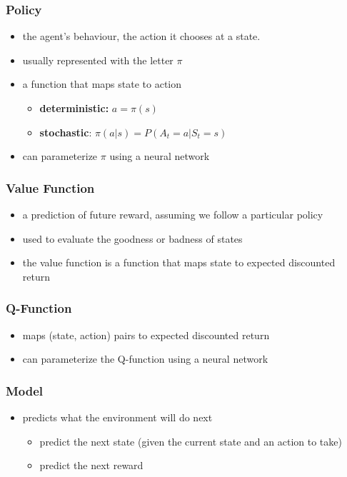 \documentclass[11pt]{article}
\begin{document}
\subsubsection{Policy}
\begin{itemize}
\item the agent's behaviour, the action it chooses at a state.  
\item usually represented with the letter $\pi$
\item a function that maps state to action
\begin{itemize}
\item \textbf{deterministic:} $ a = \pi(s)$
\item \textbf{stochastic}: $\pi (a | s) = P(A_t = a | S_t = s )$
\end{itemize}
\item can parameterize $\pi$ using a neural network
\end{itemize}
\subsubsection{Value Function}
\begin{itemize}
\item a prediction of future reward,  assuming we follow a particular policy
\item used to evaluate the goodness or badness of states
\item the value function is a function that maps state to expected discounted return
\end{itemize}
\subsubsection{Q-Function}
\begin{itemize}
\item maps (state, action) pairs to expected discounted return
\item can parameterize the Q-function using a neural network
\end{itemize}
\subsubsection{Model}
\begin{itemize}
\item predicts what the environment will do next
\begin{itemize}
\item predict the next state (given the current state and an action to take)
\item predict the next reward
\end{itemize}
\end{itemize}
\end{document}
